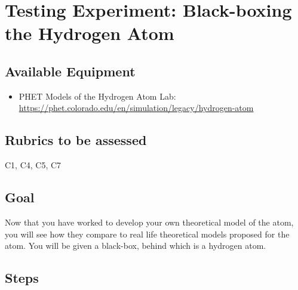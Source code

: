 \section{Testing Experiment: Black-boxing the Hydrogen Atom}


\subsection{Available Equipment}

\begin{itemize}
	\item PHET Models of the Hydrogen Atom Lab: \url{https://phet.colorado.edu/en/simulation/legacy/hydrogen-atom}
\end{itemize}

\subsection{Rubrics to be assessed}

C1, C4, C5, C7

\subsection{Goal}
Now that you have worked to develop your own theoretical model of the atom, you will see how they compare to real life theoretical models proposed for the atom. You will be given a black-box, behind which is a hydrogen atom. 
\subsection{Steps}


